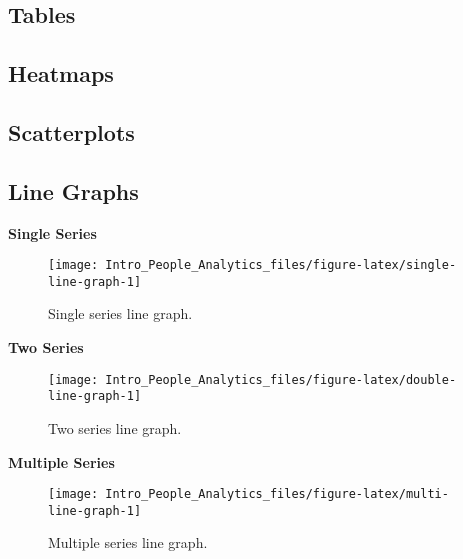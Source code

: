 \documentclass[
]{book}
\begin{document}
\hypertarget{tables}{%
\subsection{Tables}\label{tables}}

\hypertarget{heatmaps}{%
\subsection{Heatmaps}\label{heatmaps}}

\hypertarget{scatterplots}{%
\subsection{Scatterplots}\label{scatterplots}}

\hypertarget{line-graphs}{%
\subsection{Line Graphs}\label{line-graphs}}

\textbf{Single Series}

\begin{figure}

{\centering \texttt{[image: Intro\_People\_Analytics\_files/figure-latex/single-line-graph-1]} 

}

\caption{Single series line graph.}\label{fig:single-line-graph}
\end{figure}

\textbf{Two Series}

\begin{figure}

{\centering \texttt{[image: Intro\_People\_Analytics\_files/figure-latex/double-line-graph-1]} 

}

\caption{Two series line graph.}\label{fig:double-line-graph}
\end{figure}

\textbf{Multiple Series}

\begin{figure}

{\centering \texttt{[image: Intro\_People\_Analytics\_files/figure-latex/multi-line-graph-1]} 

}

\caption{Multiple series line graph.}\label{fig:multi-line-graph}
\end{figure}
\end{document}
